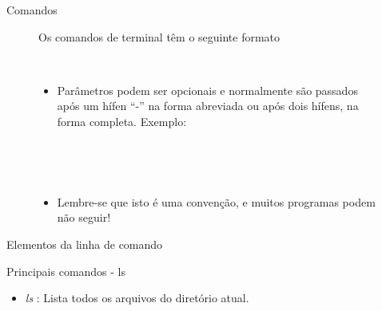 \documentclass{beamer}
\begin{document}
\begin{frame}{Comandos}
    \begin{figure}[h]
        \centering
        Os comandos de terminal têm o seguinte formato \newline \\
        \begin{shell}
        \end{shell}
        \\
        \begin{itemize}
        \item Parâmetros podem ser opcionais e normalmente são passados após um hífen
          ``-'' na forma abreviada ou após dois hífens, na forma completa.
          Exemplo:
        \end{itemize}
        \begin{shell}
          \\
         \end{shell}
        \\
        \begin{itemize}
        \item{Lembre-se que isto é uma convenção, e muitos programas podem não
          seguir!}
        \end{itemize}
    \end{figure}
\end{frame}



\begin{frame}{Elementos da linha de comando}
    \begin{figure}[h]
        \centering
        \begin{shell}
        \end{shell}
    \end{figure}
\end{frame}

\begin{frame}{Principais comandos - ls}
   \begin{itemize}
   \item \emph{ls} : Lista todos os arquivos do diretório atual.
   \end{itemize}
   \begin{shell}
   \end{shell}
\end{frame}
\end{document}
